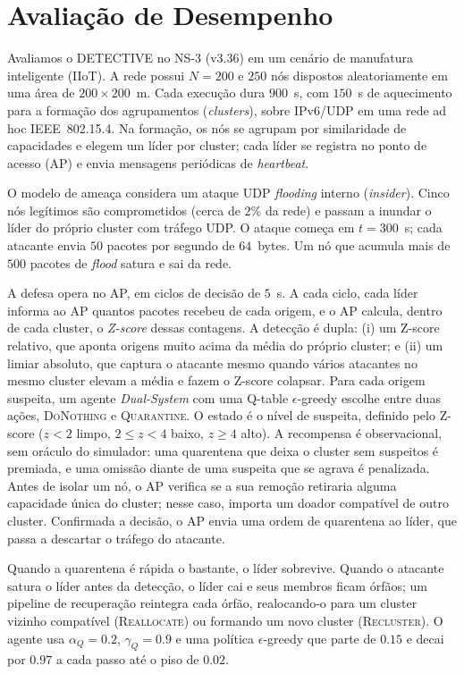 \documentclass[conference]{IEEEtran}
\begin{document}
\section{Avaliação de Desempenho}

Avaliamos o DETECTIVE no NS-3 (v3.36) em um cenário de manufatura inteligente
(IIoT). A rede possui $N = 200$ e $250$ nós dispostos aleatoriamente em uma
área de $200 \times 200$~m. Cada execução dura $900$~s, com $150$~s de aquecimento
para a formação dos agrupamentos (\emph{clusters}), sobre IPv6/UDP em uma rede ad
hoc IEEE~802.15.4. Na formação, os nós se agrupam por similaridade de capacidades e
elegem um líder por cluster; cada líder se registra no ponto de acesso (AP) e envia
mensagens periódicas de \emph{heartbeat}.

O modelo de ameaça considera um ataque UDP \emph{flooding} interno (\emph{insider}).
Cinco nós legítimos são comprometidos (cerca de $2\%$ da rede) e passam a inundar o
líder do próprio cluster com tráfego UDP. O ataque começa em $t = 300$~s; cada
atacante envia $50$ pacotes por segundo de $64$~bytes. Um nó que acumula mais de
$500$ pacotes de \emph{flood} satura e sai da rede.

A defesa opera no AP, em ciclos de decisão de $5$~s. A cada ciclo, cada líder
informa ao AP quantos pacotes recebeu de cada origem, e o AP calcula, dentro de cada
cluster, o \emph{Z-score} dessas contagens. A detecção é dupla: (i) um Z-score
relativo, que aponta origens muito acima da média do próprio cluster; e (ii) um
limiar absoluto, que captura o atacante mesmo quando vários atacantes no mesmo
cluster elevam a média e fazem o Z-score colapsar. Para cada origem suspeita, um
agente \emph{Dual-System} com uma Q-table $\epsilon$-greedy escolhe entre duas
ações, \textsc{DoNothing} e \textsc{Quarantine}. O estado é o nível de suspeita,
definido pelo Z-score ($z<2$ limpo, $2 \le z < 4$ baixo, $z \ge 4$ alto). A
recompensa é observacional, sem oráculo do simulador: uma quarentena que deixa o
cluster sem suspeitos é premiada, e uma omissão diante de uma suspeita que se agrava
é penalizada. Antes de isolar um nó, o AP verifica se a sua remoção retiraria alguma
capacidade única do cluster; nesse caso, importa um doador compatível de outro
cluster. Confirmada a decisão, o AP envia uma ordem de quarentena ao líder, que
passa a descartar o tráfego do atacante.

Quando a quarentena é rápida o bastante, o líder sobrevive. Quando o atacante satura
o líder antes da detecção, o líder cai e seus membros ficam órfãos; um pipeline de
recuperação reintegra cada órfão, realocando-o para um cluster vizinho compatível
(\textsc{Reallocate}) ou formando um novo cluster (\textsc{Recluster}). O agente usa
$\alpha_Q = 0.2$, $\gamma_Q = 0.9$ e uma política $\epsilon$-greedy que parte de
$0.15$ e decai por $0.97$ a cada passo até o piso de $0.02$.
\end{document}
